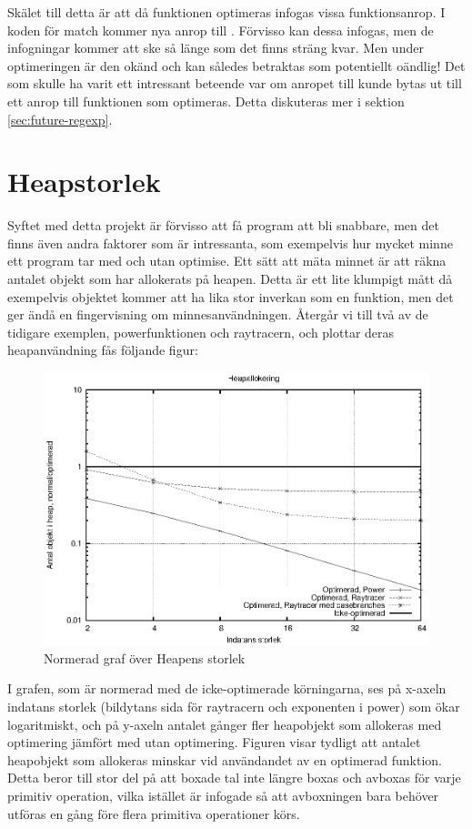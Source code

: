 \documentclass[Rapport]{subfiles}
\begin{document}
Skälet till detta är att då funktionen  optimeras infogas
vissa funktionsanrop. I koden för match kommer nya anrop till .
Förvisso kan dessa infogas, men de infogningar kommer att ske så länge som det
finns sträng kvar. Men under optimeringen är den okänd och kan således betraktas
som potentiellt oändlig! Det som skulle ha varit ett intressant beteende var
om anropet till  kunde bytas ut till ett anrop till funktionen
som optimeras. Detta diskuteras mer i sektion
\ref{sec:future-regexp}.



\section{Heapstorlek}
Syftet med detta projekt är förvisso att få program att bli snabbare, men det finns även andra faktorer som är intressanta, som exempelvis hur mycket minne ett program tar med och utan optimise. Ett sätt att mäta minnet är att räkna antalet objekt som har allokerats på heapen. Detta är ett lite klumpigt mått då exempelvis objektet  kommer att ha lika stor inverkan som en funktion, men det ger ändå en fingervisning om minnesanvändningen.
Återgår vi till två av de tidigare exemplen, powerfunktionen och raytracern, och plottar deras heapanvändning fås följande figur:

\begin{figure}[H]
\includegraphics{heap.eps}
\caption{Normerad graf över Heapens storlek}
\label{fig:Resultat:heap:graf}
\end{figure}

I grafen, som är normerad med de icke-optimerade körningarna, ses
på x-axeln indatans storlek (bildytans sida för raytracern och exponenten i power) som ökar logaritmiskt, och 
på y-axeln antalet gånger fler heapobjekt som allokeras med optimering jämfört med utan optimering.
Figuren visar tydligt att antalet heapobjekt som allokeras minskar vid användandet av en optimerad funktion. Detta beror till stor del på att boxade tal inte längre boxas och avboxas för varje primitiv operation, vilka istället är infogade så att avboxningen bara behöver utföras en gång före flera primitiva operationer körs.
\end{document}
